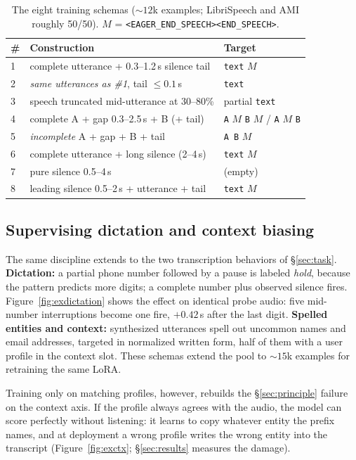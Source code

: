 \documentclass[11pt]{article}
\newcommand{\fire}{\texttt{<END\_SPEECH>}}
\newcommand{\eager}{\texttt{<EAGER\_END\_SPEECH>}}
\begin{document}
\begin{table}[t]
  \centering\small
  \caption{The eight training schemas (${\sim}12$k examples; LibriSpeech and AMI roughly 50/50). $M$ = \eager\fire.}
  \label{tab:schemas}
  \begin{tabular}{lll}
    \toprule
    \# & Construction & Target \\
    \midrule
    1 & complete utterance + 0.3--1.2\,s silence tail & \texttt{text} $M$ \\
    2 & \emph{same utterances as \#1}, tail ${\leq}0.1$\,s & \texttt{text} \\
    3 & speech truncated mid-utterance at 30--80\% & partial \texttt{text} \\
    4 & complete A + gap 0.3--2.5\,s + B (+ tail) & \texttt{A} $M$ \texttt{B} $M$ / \texttt{A} $M$ \texttt{B} \\
    5 & \emph{incomplete} A + gap + B + tail & \texttt{A B} $M$ \\
    6 & complete utterance + long silence (2--4\,s) & \texttt{text} $M$ \\
    7 & pure silence 0.5--4\,s & (empty) \\
    8 & leading silence 0.5--2\,s + utterance + tail & \texttt{text} $M$ \\
    \bottomrule
  \end{tabular}
\end{table}

\subsection{Supervising dictation and context biasing}
\label{sec:ctxrecipe}

The same discipline extends to the two transcription behaviors of \S\ref{sec:task}. \textbf{Dictation:} a partial phone number followed by a pause is labeled \emph{hold}, because the pattern predicts more digits; a complete number plus observed silence fires. Figure~\ref{fig:exdictation} shows the effect on identical probe audio: five mid-number interruptions become one fire, $+0.42$\,s after the last digit. \textbf{Spelled entities and context:} synthesized utterances spell out uncommon names and email addresses, targeted in normalized written form, half of them with a user profile in the context slot. These schemas extend the pool to ${\sim}15$k examples for retraining the same LoRA.

Training only on matching profiles, however, rebuilds the \S\ref{sec:principle} failure on the context axis. If the profile always agrees with the audio, the model can score perfectly without listening: it learns to copy whatever entity the prefix names, and at deployment a wrong profile writes the wrong entity into the transcript (Figure~\ref{fig:exctx}; \S\ref{sec:results} measures the damage).
\end{document}
